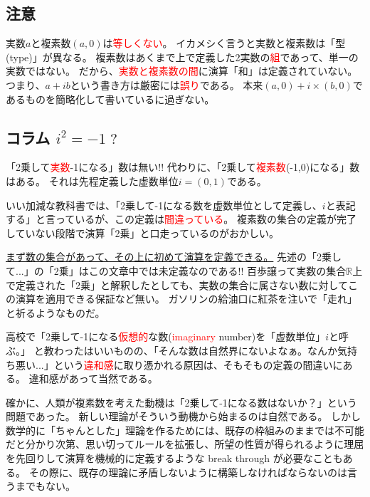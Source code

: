         \subsection{注意}
            実数$a$と複素数$(a,0)$は\textcolor{red}{等しくない}。
            イカメシく言うと実数と複素数は「型(type)」が異なる。
            複素数はあくまで上で定義した2実数の\textcolor{red}{組}であって、単一の実数ではない。
            だから、\textcolor{red}{実数と複素数の間}に演算「和」は定義されていない。
            つまり、$a+ib$という書き方は厳密には\textcolor{red}{誤り}である。
            本来$(a,0)+i\times(b,0)$であるものを簡略化して書いているに過ぎない。
        \subsection{コラム \texorpdfstring{$i^2=-1\;?$}{虚数単位の2乗は-1?}}
            「2乗して\textcolor{red}{実数}-1になる」数は無い!! 代わりに、「2乗して\textcolor{red}{複素数}(-1,0)になる」数はある。
            それは先程定義した虚数単位$i=(0,1)$である。
            \par
            いい加減な教科書では、「2乗して-1になる数を虚数単位として定義し、$i$と表記する」と言っているが、この定義は\textcolor{red}{間違っている}。
            複素数の集合の定義が完了していない段階で演算「2乗」と口走っているのがおかしい。
            \par
            \underline{まず数の集合があって、その上に初めて演算を定義できる。}
            先述の「2乗して...」の「2乗」はこの文章中では未定義なのである!!
            百歩譲って実数の集合$\mathbb{R}$上で定義された「2乗」と解釈したとしても、実数の集合に属さない数に対してこの演算を適用できる保証など無い。
            ガソリンの給油口に紅茶を注いで「走れ」と祈るようなものだ。
            \par
            高校で「2乗して-1になる\textcolor{red}{仮想的}な数(\textcolor{red}{imaginary} number)を「虚数単位」$i$と呼ぶ。」
            と教わったはいいものの、「そんな数は自然界にないよなぁ。なんか気持ち悪い...」という\textcolor{red}{違和感}に取り憑かれる原因は、そもそもの定義の間違いにある。
            違和感があって当然である。
            \par
            確かに、人類が複素数を考えた動機は「2乗して-1になる数はないか？」という問題であった。
            新しい理論がそういう動機から始まるのは自然である。
            しかし数学的に「ちゃんとした」理論を作るためには、既存の枠組みのままでは不可能だと分かり次第、思い切ってルールを拡張し、所望の性質が得られるように理屈を先回りして演算を機械的に定義するような break through が必要なこともある。
            その際に、既存の理論に矛盾しないように構築しなければならないのは言うまでもない。
